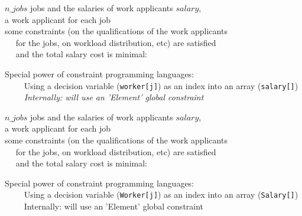 \documentclass{cons-beamer}
\begin{document}
\begin{flashcardcpmpy}
\begin{frame}
  \begin{example}
     $n\_jobs$ jobs and the salaries of work applicants $salary$, \\ 
     a work applicant for each job \\ 
     some constraints (on the qualifications of the work applicants \\
    ~~ for the jobs, on workload distribution, etc) are satisfied \\ 
    ~~ and the total salary cost is minimal: 

    
    \vspace{-3mm}
  \end{example} \vfill

  \textcolor{Melon}{Special power} of constraint programming languages: \\
  ~~~~ Using a decision variable (\texttt{worker[j]}) as an index into an array (\texttt{salary[]}) \\
  ~~~~ \textit{Internally: will use an 'Element' global constraint}
\end{frame}
\end{flashcardcpmpy}
\begin{flashcardminizinc}
\begin{frame}[fragile]
  \begin{example}
     $n\_jobs$ jobs and the salaries of work applicants $salary$, \\ 
     a work applicant for each job \\ 
     some constraints (on the qualifications of the work applicants \\
    ~~ for the jobs, on workload distribution, etc) are satisfied \\ 
    ~~ and the total salary cost is minimal: 

    \footnotesize
    
  \end{example} \vfill

  \textcolor{Melon}{Special power} of constraint programming languages: \\
  ~~~~ Using a decision variable (\texttt{Worker[j]}) as an index into an array (\texttt{Salary[]}) \\
  ~~~~ Internally: will use an 'Element' global constraint
\end{frame}
\end{flashcardminizinc}
\end{document}
